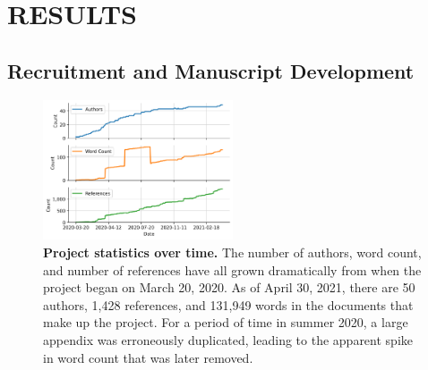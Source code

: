 \documentclass[sigconf]{acmart}
\begin{document}
\hypertarget{results}{%
\section{RESULTS}\label{results}}

\hypertarget{recruitment-and-manuscript-development}{%
\subsection{Recruitment and Manuscript Development}\label{recruitment-and-manuscript-development}}

\begin{figure}
\hypertarget{fig:projectstats}{%
\centering
  \includegraphics[width=0.5\textwidth]{../content/images/manuscript_stats.png}
  \caption{\textbf{Project statistics over time.}
  The number of authors, word count, and number of references have all grown dramatically from when the project began on March 20, 2020.
  As of April 30, 2021, there are 50 authors, 1,428 references, and 131,949 words in the documents that make up the project.
  For a period of time in summer 2020, a large appendix was erroneously duplicated, leading to the apparent spike in word count that was later removed.
  }
  \label{fig:projectstats}
}
\end{figure}
\end{document}
